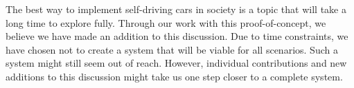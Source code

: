 
The best way to implement self-driving cars in society is a topic that will take a long time to explore fully. Through our work with this proof-of-concept, we believe we have made an addition to this discussion. Due to time constraints, we have chosen not to create a system that will be viable for all scenarios. Such a system might still seem out of reach. However, individual contributions and new additions to this discussion might take us one step closer to a complete system.


%

% 